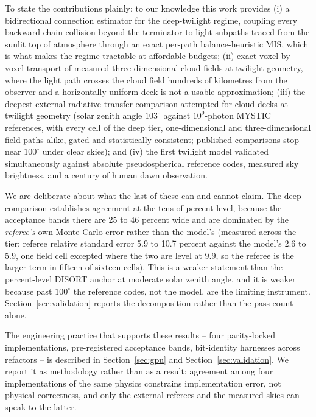 \documentclass[preprint,12pt]{elsarticle}
\begin{document}
To state the contributions plainly: to our knowledge this work
provides (i) a bidirectional connection estimator for the deep-twilight
regime, coupling every backward-chain collision beyond the terminator to
light subpaths traced from the sunlit top of atmosphere through an exact
per-path balance-heuristic MIS, which is what makes the regime tractable
at affordable budgets; (ii) exact voxel-by-voxel transport of measured
three-dimensional cloud fields at twilight geometry, where the light
path crosses the cloud field hundreds of kilometres from the observer
and a horizontally uniform deck is not a usable approximation;
(iii) the deepest external radiative transfer comparison
attempted for cloud decks at twilight geometry (solar
zenith angle $103^{\circ}$ against $10^{9}$-photon MYSTIC references,
with every cell of the deep tier, one-dimensional and
three-dimensional field paths alike, gated and statistically
consistent;
published comparisons stop near $100^{\circ}$ under clear skies); and
(iv) the first twilight model validated simultaneously against
absolute pseudospherical reference codes, measured sky brightness, and a
century of human dawn observation.

We are deliberate about what the last of these can and cannot claim. The
deep comparison establishes agreement at the tens-of-percent level, because
the acceptance bands there are 25 to 46 percent wide and are dominated by
the \emph{referee's} own Monte Carlo error rather than the model's
(measured across the tier: referee relative standard error 5.9 to 10.7
percent against the model's 2.6 to 5.9, one field cell excepted where
the two are level at 9.9, so the referee is the larger term in fifteen
of sixteen cells). This is a weaker statement than the
percent-level DISORT anchor at moderate solar zenith angle, and it is
weaker because past $100^{\circ}$ the reference codes, not the model,
are the limiting instrument. Section~\ref{sec:validation} reports the
decomposition rather than the pass count alone.

The engineering practice that supports these results -- four
parity-locked implementations, pre-registered acceptance bands,
bit-identity harnesses across refactors -- is described in
Section~\ref{sec:gpu} and Section~\ref{sec:validation}. We report it as
methodology rather than as a result: agreement among four
implementations of the same physics constrains implementation error, not
physical correctness, and only the external referees and the measured
skies can speak to the latter.
\end{document}
